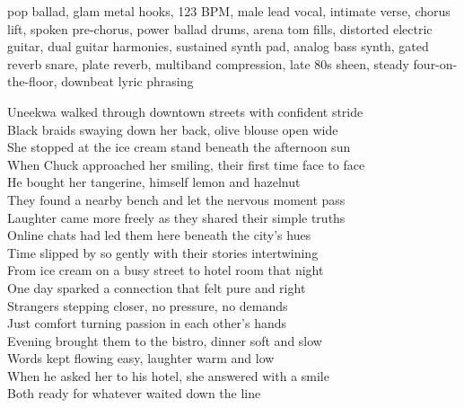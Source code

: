 

\begin{notes}
\end{notes}
\begin{style}
pop ballad, glam metal hooks, 123 BPM, male lead vocal, intimate verse, chorus lift, spoken pre-chorus, power ballad drums, arena tom fills, distorted electric guitar, dual guitar harmonies, sustained synth pad, analog bass synth, gated reverb snare, plate reverb, multiband compression, late 80s sheen, steady four-on-the-floor, downbeat lyric phrasing
\end{style}
\begin{lyrics}
Uneekwa walked through downtown streets with confident stride\\
Black braids swaying down her back, olive blouse open wide\\
She stopped at the ice cream stand beneath the afternoon sun\\
When Chuck approached her smiling, their first time face to face\\

He bought her tangerine, himself lemon and hazelnut\\
They found a nearby bench and let the nervous moment pass\\
Laughter came more freely as they shared their simple truths\\
Online chats had led them here beneath the city’s hues\\

Time slipped by so gently with their stories intertwining\\

From ice cream on a busy street to hotel room that night\\
One day sparked a connection that felt pure and right\\
Strangers stepping closer, no pressure, no demands\\
Just comfort turning passion in each other’s hands\\

Evening brought them to the bistro, dinner soft and slow\\
Words kept flowing easy, laughter warm and low\\
When he asked her to his hotel, she answered with a smile\\
Both ready for whatever waited down the line\\


\end{lyrics}
